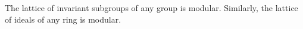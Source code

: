 The lattice of invariant subgroups of any group is modular. Similarly, the lattice of ideals of any ring is modular.

